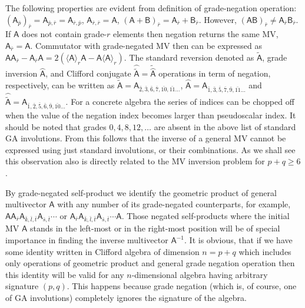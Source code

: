 \documentclass{birkjour}
\newcommand{\reverse}[1]{\widetilde{#1}}
\newcommand{\gradeinverse}[1]{\wideparen{#1}}
\newcommand{\cliffordconjugate}[1]{\wideparen{\widetilde{#1}}}
\def\m#1{\mathsf{#1}} %
\begin{document}
The following properties are evident  from definition of
grade-negation operation: $(\m{A}_{\bar p})_{\bar r}=\m{A}_{{\bar
p},{\bar r}}=\m{A}_{{\bar r},{\bar p}}$, $\m{A}_{{\bar r},{\bar
r}}=\m{A}$, $(\m{A}+\m{B})_{\bar r}=\m{A}_{\bar r}+\m{B}_{\bar
r}$. However, $(\m{AB})_{\bar r}\ne \m{A}_{\bar r}\m{B}_{\bar r}$.
If $\m{A}$ does not contain grade-$r$ elements then negation
returns the same MV, $\m{A}_{\bar r}=\m{A}$. Commutator with
grade-negated MV then can be expressed as $\m{A} \m{A}_{\bar
r}-\m{A}_{\bar r}\m{A}=2(\langle \m{A}\rangle_r\m{A}-\m{A}\langle
\m{A}\rangle_r)$. The standard reversion denoted as
$\reverse{\m{A}}$, grade inversion $\gradeinverse{\m{A}}$, and
Clifford conjugate
$\cliffordconjugate{\m{A}}=\reverse{\gradeinverse{\m{A}}}$
operations in term of negation, respectively, can be written as
$\reverse{\m{A}}=\m{A}_{{\bar 2},{\bar 3},{\bar 6},{\bar 7},{\bar
{10}},{\bar {11}}\dots}$, $\gradeinverse{\m{A}}=\m{A}_{{\bar
1},{\bar 3},{\bar 5},{\bar 7},{\bar {9}},{\bar {11}}\dots}$ and
$\cliffordconjugate{\m{A}}=\m{A}_{{\bar 1},{\bar 2},{\bar 5},{\bar
6},{\bar {9}},{\bar {10}}\dots}$. For a concrete algebra the
series of indices can be chopped off when the value of the
negation index becomes larger than pseudoscalar index. It should
be noted that grades $0,4,8,12,\dots$ are absent in the above list
of standard GA involutions. From this follows that the inverse of
a general MV cannot be expressed using just standard involutions,
or their combinations. As we shall see this observation also is directly related to the MV inversion problem for $p+q\ge 6$.

By grade-negated self-product we identify the geometric product of
general multivector $\m{A}$ with any number of its grade-negated
counterparts, for example, $\m{A} \m{A}_{\bar r} \m{A}_{\bar
k,\bar l,\bar t} \m{A}_{\bar s, \bar t}\cdots$ or $\m{A}_{\bar r}
\m{A}_{\bar k,\bar l,\bar t} \m{A}_{\bar s, \bar t}\cdots\m{A} $.
Those negated self-products where the initial MV $\m{A}$ stands in
the left-most or in the right-most position will be of special
importance in finding the inverse multivector $\m{A}^{-1}$. It is
obvious, that if we have  some identity written in Clifford
algebra of dimension $n=p+q$ which includes only operations of
geometric product and general grade negation operation  then this
identity will be valid for any $n$-dimensional algebra having
arbitrary signature $(p,q)$. This happens because grade negation
(which is, of course, one of GA involutions) completely
ignores the signature of the algebra.
\end{document}
